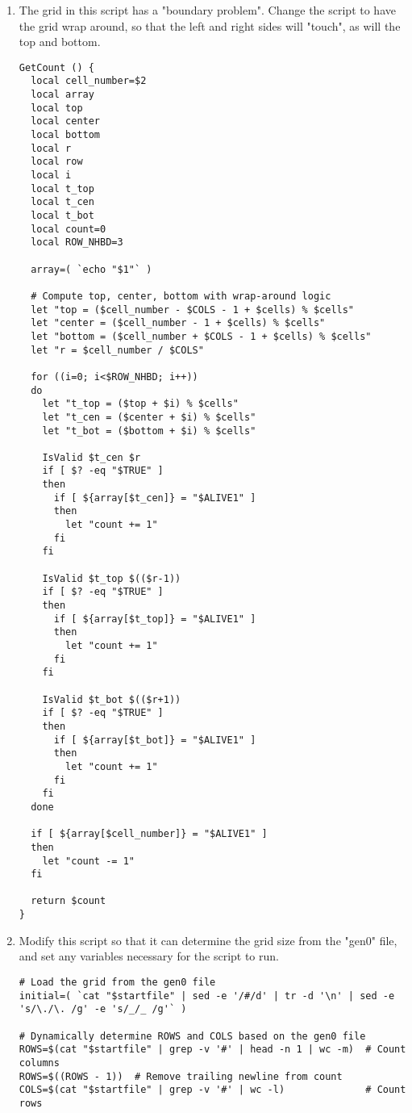 \documentclass[a4paper, 12pt]{article}
\begin{document}
\begin{enumerate}
    \item The grid in this script has a "boundary problem". Change the script to have the grid wrap around, so that the left and right sides will "touch", as will the top and bottom.
    \begin{lstlisting}
GetCount () {
  local cell_number=$2
  local array
  local top
  local center
  local bottom
  local r
  local row
  local i
  local t_top
  local t_cen
  local t_bot
  local count=0
  local ROW_NHBD=3

  array=( `echo "$1"` )

  # Compute top, center, bottom with wrap-around logic
  let "top = ($cell_number - $COLS - 1 + $cells) % $cells"
  let "center = ($cell_number - 1 + $cells) % $cells"
  let "bottom = ($cell_number + $COLS - 1 + $cells) % $cells"
  let "r = $cell_number / $COLS"

  for ((i=0; i<$ROW_NHBD; i++))           
  do
    let "t_top = ($top + $i) % $cells"
    let "t_cen = ($center + $i) % $cells"
    let "t_bot = ($bottom + $i) % $cells"

    IsValid $t_cen $r                   
    if [ $? -eq "$TRUE" ]
    then
      if [ ${array[$t_cen]} = "$ALIVE1" ]
      then
        let "count += 1"
      fi
    fi

    IsValid $t_top $(($r-1))                   
    if [ $? -eq "$TRUE" ]
    then
      if [ ${array[$t_top]} = "$ALIVE1" ]
      then
        let "count += 1"
      fi
    fi

    IsValid $t_bot $(($r+1))                   
    if [ $? -eq "$TRUE" ]
    then
      if [ ${array[$t_bot]} = "$ALIVE1" ]
      then
        let "count += 1"
      fi
    fi
  done

  if [ ${array[$cell_number]} = "$ALIVE1" ]
  then
    let "count -= 1"
  fi

  return $count
}
    \end{lstlisting}
    \item Modify this script so that it can determine the grid size from the "gen0" file, and set any variables necessary for the script to run.
    \begin{lstlisting}
# Load the grid from the gen0 file
initial=( `cat "$startfile" | sed -e '/#/d' | tr -d '\n' | sed -e 's/\./\. /g' -e 's/_/_ /g'` )

# Dynamically determine ROWS and COLS based on the gen0 file
ROWS=$(cat "$startfile" | grep -v '#' | head -n 1 | wc -m)  # Count columns
ROWS=$((ROWS - 1))  # Remove trailing newline from count
COLS=$(cat "$startfile" | grep -v '#' | wc -l)              # Count rows


\end{lstlisting}
\end{enumerate}
\end{document}
